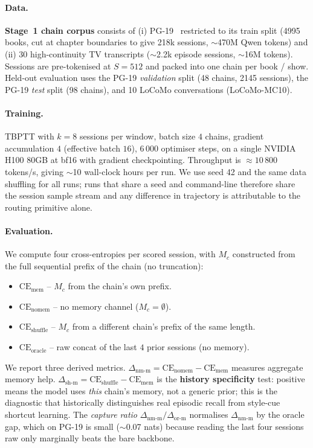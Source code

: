 \documentclass{article}
\newcommand{\dnm}{\Delta_{\text{nm-m}}}
\newcommand{\dsh}{\Delta_{\text{sh-m}}}
\newcommand{\dor}{\Delta_{\text{or-m}}}
\newcommand{\CEmem}{\mathrm{CE}_{\text{mem}}}
\newcommand{\CEnomem}{\mathrm{CE}_{\text{nomem}}}
\newcommand{\CEsh}{\mathrm{CE}_{\text{shuffle}}}
\newcommand{\CEor}{\mathrm{CE}_{\text{oracle}}}
\begin{document}
\paragraph{Data.}
\textbf{Stage~1 chain corpus} consists of (i) PG-19~\cite{rae2019compressive}
restricted to its train split (4995 books, cut at chapter
boundaries to give 218k sessions, $\sim$470M Qwen tokens) and (ii) 30
high-continuity TV transcripts ($\sim$2.2k episode sessions,
$\sim$16M tokens). Sessions are pre-tokenised at $S=512$ and packed
into one chain per book / show. Held-out evaluation uses the PG-19
\emph{validation} split (48 chains, 2145 sessions), the
PG-19 \emph{test} split (98 chains), and 10 LoCoMo conversations
(LoCoMo-MC10).

\paragraph{Training.}
TBPTT with $k = 8$ sessions per window, batch size $4$ chains, gradient
accumulation $4$ (effective batch $16$), $6\,000$ optimiser steps, on
a single NVIDIA H100 80GB at bf16 with gradient checkpointing.
Throughput is $\approx\!10\,800$ tokens/s, giving $\sim$10 wall-clock hours
per run. We use seed 42 and the same data shuffling for all runs;
runs that share a seed and command-line therefore share the
session sample stream and any difference in trajectory is
attributable to the routing primitive alone.

\paragraph{Evaluation.}
We compute four cross-entropies per scored session, with $M_c$
constructed from the full sequential prefix of the chain
(no truncation):
\begin{itemize}\setlength{\itemsep}{0pt}
\item $\CEmem$ -- $M_c$ from the chain's own prefix.
\item $\CEnomem$ -- no memory channel ($M_c = \emptyset$).
\item $\CEsh$ -- $M_c$ from a different chain's prefix of the same length.
\item $\CEor$ -- raw concat of the last $4$ prior sessions (no memory).
\end{itemize}
We report three derived metrics.
$\dnm = \CEnomem - \CEmem$ measures aggregate memory help.
$\dsh = \CEsh - \CEmem$ is the \textbf{history specificity} test:
positive means the model uses \emph{this} chain's memory, not a
generic prior; this is the diagnostic that historically distinguishes
real episodic recall from style-cue shortcut learning.
The \emph{capture ratio} $\dnm / \dor$ normalises $\dnm$ by the oracle
gap, which on PG-19 is small ($\sim$0.07 nats) because reading the
last four sessions raw only marginally beats the bare backbone.
\end{document}
